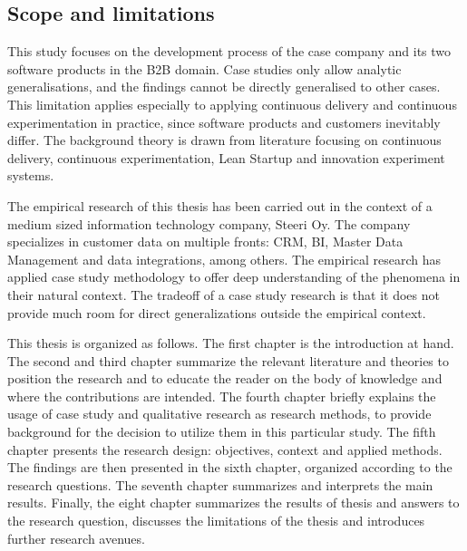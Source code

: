 \documentclass[english, grading]{tktltiki2}
\theoremstyle{definition}
\theoremstyle{remark}
\begin{document}
\subsection{Scope and limitations}
This study focuses on the development process of the case company and its two software products in the B2B domain. Case studies only allow analytic generalisations, and the findings cannot be directly generalised to other cases. This limitation applies especially to applying continuous delivery and continuous experimentation in practice, since software products and customers inevitably differ. The background theory is drawn from literature focusing on continuous delivery, continuous experimentation, Lean Startup and innovation experiment systems. 

The empirical research of this thesis has been carried out in the context of a medium sized information technology company, Steeri Oy. The company specializes in customer data on multiple fronts: CRM, BI, Master Data Management and data integrations, among others. The empirical research has applied case study methodology to offer deep understanding of the phenomena in their natural context. The tradeoff of a case study research is that it does not provide much room for direct generalizations outside the empirical context. 

This thesis is organized as follows. The first chapter is the introduction at hand. The second and third chapter summarize the relevant literature and theories to position the research and to educate the reader on the body of knowledge and where the contributions are intended. The fourth chapter briefly explains the usage of case study and qualitative research as research methods, to provide background for the decision to utilize them in this particular study. The fifth chapter presents the research design: objectives, context and applied methods. The findings are then presented in the sixth chapter, organized according to the research questions. The seventh chapter summarizes and interprets the main results. Finally, the eight chapter summarizes the results of thesis and answers to the research question, discusses the limitations of the thesis and introduces further research avenues.
%
\end{document}

